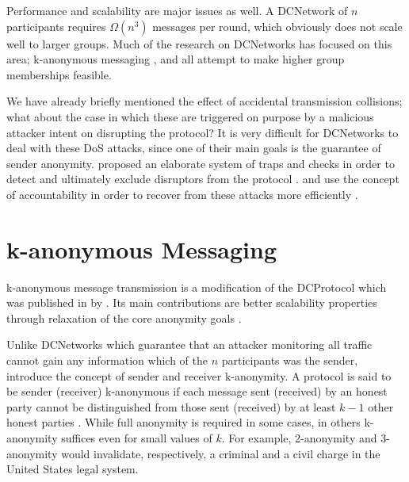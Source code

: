 Performance and scalability are major issues as well. A \ac{DCNetwork} of $n$ participants requires $\Omega(n^3)$ messages per round, which obviously does not scale well to larger groups.
Much of the research on \acp{DCNetwork} has focused on this area; k-anonymous messaging \cite{von2003k},
\Dissent \cite{journals/corr/abs-1004-3057} and \Verdict \cite{corrigan2013proactively}
all attempt to make higher group memberships feasible.

We have already briefly mentioned the effect of accidental transmission collisions; what about the
case in which these are triggered on purpose by a malicious attacker intent on disrupting the
protocol? It is very difficult for \acp{DCNetwork} to deal with these \ac{DoS} attacks,
since one of their main goals is the guarantee of sender anonymity. \citeauthor{journals/joc/Chaum88}
proposed an elaborate system of traps and checks in order to detect and ultimately exclude
disruptors from the protocol \cite{journals/joc/Chaum88}. \Dissent and \Verdict use the concept of
accountability in order to recover from these attacks more efficiently \cite{journals/corr/abs-1004-3057,corrigan2013proactively}.

\section{k-anonymous Messaging} \label{sec:k-anonymous_messaging}


k-anonymous message transmission is a modification of the \ac{DCProtocol} which was published in \citeyear{von2003k} by \citeauthor{von2003k}. Its main contributions are better scalability properties through relaxation
of the core anonymity goals \cite{von2003k}.

Unlike \acp{DCNetwork} which guarantee that an attacker monitoring all traffic cannot gain
any information which of the $n$ participants was the sender, \citeauthor{von2003k} introduce
the concept of sender and receiver k-anonymity. A protocol is said to be sender (receiver) k-anonymous
if each message sent (received) by an honest party cannot be distinguished from those
sent (received) by at least $k - 1$
other honest parties \cite{von2003k}. While full anonymity is required in some cases, in others
k-anonymity suffices even for small values of $k$. For example, 2-anonymity and 3-anonymity would invalidate, respectively, a criminal and a civil charge in the United States legal system.

